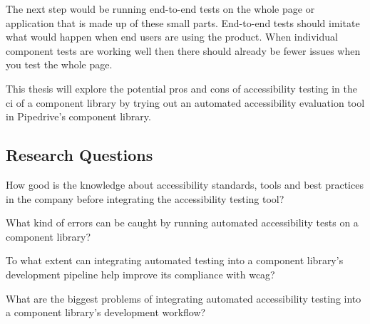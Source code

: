 \documentclass{master_thesis}
\begin{document}
The next step would be running end-to-end tests on the whole page or application that is made up of these small parts. End-to-end tests should imitate what would happen when end users are using the product. When individual component tests are working well then there should already be fewer issues when you test the whole page.

This thesis will explore the potential pros and cons of accessibility testing in the \ac{ci} of a component library by trying out an automated accessibility evaluation tool in Pipedrive's component library.

\subsection{Research Questions}

	\begin{RQlist}
		\item How good is the knowledge about accessibility standards, tools and best practices in the company before integrating the accessibility testing tool?
		\item What kind of errors can be caught by running automated accessibility tests on a component library?
		\item To what extent can integrating automated testing into a component library's development pipeline help improve its compliance with \ac{wcag}?
		\item What are the biggest problems of integrating automated accessibility testing into a component library's development workflow?
	\end{RQlist}
\end{document}
